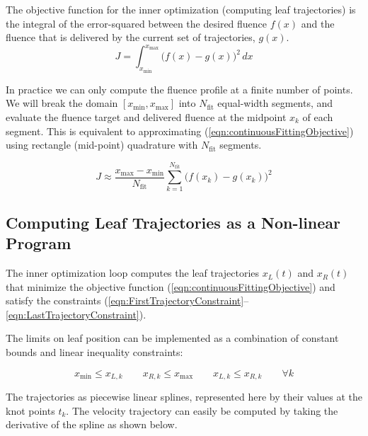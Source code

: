The objective function for the inner optimization (computing leaf trajectories)
is the integral of the error-squared between the desired fluence $f(x)$ and the fluence that
is delivered by the current set of trajectories, $g(x)$.
\begin{equation}
  J = \int_{x_\text{min}}^{x_\text{max}} \! \bigg( f(x) - g(x) \bigg)^2 \,dx
  \label{eqn:continuousFittingObjective}
\end{equation}

In practice we can only compute the fluence profile at a finite number of points.
We will break the domain $[x_\text{min}, x_\text{max}]$ into $N_\text{fit}$ equal-width segments,
and evaluate the fluence target and delivered fluence at the midpoint $x_k$ of each segment.
This is equivalent to approximating (\ref{eqn:continuousFittingObjective}) using rectangle (mid-point)
quadrature with $N_\text{fit}$ segments.

\begin{equation}
  J \approx \frac{x_\text{max} - x_\text{min}}{N_\text{fit}}
  \sum_{k = 1}^{N_\text{fit}} \! \bigg( f(x_k) - g(x_k) \bigg)^2
  \label{eqn:discreteFittingObjective}
\end{equation}

\subsection{Computing Leaf Trajectories as a Non-linear Program}
\label{sec:LeafTrajectoryAsNLP}

The inner optimization loop computes the leaf trajectories $x_L(t)$ and $x_R(t)$
that minimize the objective function (\ref{eqn:continuousFittingObjective})
and satisfy the constraints (\ref{eqn:FirstTrajectoryConstraint}--\ref{eqn:LastTrajectoryConstraint}).

The limits on leaf position can be implemented as a combination of
constant bounds and linear inequality constraints:

\begin{equation}
  x_\text{min} \leq x_{L, k}
  \quad \quad
  x_{R, k} \leq x_\text{max}
  \quad \quad
  x_{L, k} \leq x_{R, k}
  \quad \quad
  \forall k
  \label{eqn:PositionLimits}
\end{equation}

The trajectories as piecewise linear splines, represented here by their values at the knot points $t_k$.
The velocity trajectory can easily be computed by taking the derivative of the spline as shown below.


